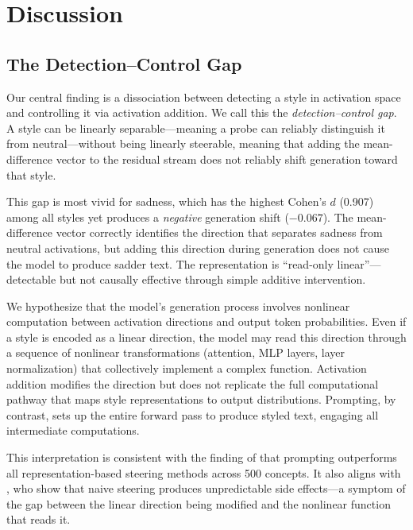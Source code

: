 \section{Discussion}
\label{sec:discussion}

\subsection{The Detection--Control Gap}

Our central finding is a dissociation between detecting a style in activation space and controlling it via activation addition. We call this the \emph{detection--control gap}. A style can be linearly separable---meaning a probe can reliably distinguish it from neutral---without being linearly steerable, meaning that adding the mean-difference vector to the residual stream does not reliably shift generation toward that style.

This gap is most vivid for sadness, which has the highest Cohen's $d$ (0.907) among all styles yet produces a \emph{negative} generation shift ($-0.067$). The mean-difference vector correctly identifies the direction that separates sadness from neutral activations, but adding this direction during generation does not cause the model to produce sadder text. The representation is ``read-only linear''---detectable but not causally effective through simple additive intervention.

 We hypothesize that the model's generation process involves nonlinear computation between activation directions and output token probabilities. Even if a style is encoded as a linear direction, the model may read this direction through a sequence of nonlinear transformations (attention, MLP layers, layer normalization) that collectively implement a complex function. Activation addition modifies the direction but does not replicate the full computational pathway that maps style representations to output distributions. Prompting, by contrast, sets up the entire forward pass to produce styled text, engaging all intermediate computations.

This interpretation is consistent with the finding of \citet{wu2025axbench} that prompting outperforms all representation-based steering methods across 500 concepts. It also aligns with \citet{chalnev2024improving}, who show that naive steering produces unpredictable side effects---a symptom of the gap between the linear direction being modified and the nonlinear function that reads it.

